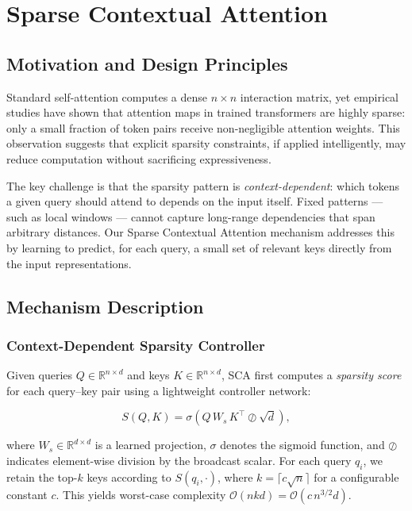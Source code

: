 \documentclass[12pt,a4paper,oneside]{book}
\begin{document}
\chapter{Sparse Contextual Attention}
\label{chap:sca}

\section{Motivation and Design Principles}

Standard self-attention computes a dense $n \times n$ interaction matrix, yet empirical
studies \cite{clark2019does, kovaleva2019revealing} have shown that attention maps in
trained transformers are highly sparse: only a small fraction of token pairs receive
non-negligible attention weights. This observation suggests that explicit sparsity
constraints, if applied intelligently, may reduce computation without sacrificing
expressiveness.

The key challenge is that the sparsity pattern is \textit{context-dependent}:
which tokens a given query should attend to depends on the input itself. Fixed patterns
— such as local windows — cannot capture long-range dependencies that span arbitrary
distances. Our Sparse Contextual Attention mechanism addresses this by learning to
predict, for each query, a small set of relevant keys directly from the input
representations.

\section{Mechanism Description}
\label{sec:sca}

\subsection{Context-Dependent Sparsity Controller}

Given queries $Q \in \mathbb{R}^{n \times d}$ and keys $K \in \mathbb{R}^{n \times d}$,
SCA first computes a \textit{sparsity score} for each query--key pair using a lightweight
controller network:

\begin{equation}
  S(Q,K) = \sigma\!\left( Q\,W_s\,K^{\top} \oslash \sqrt{d} \right),
  \label{eq:sparsity-score}
\end{equation}

where $W_s \in \mathbb{R}^{d \times d}$ is a learned projection, $\sigma$ denotes the
sigmoid function, and $\oslash$ indicates element-wise division by the broadcast scalar.
For each query $q_i$, we retain the top-$k$ keys according to $S(q_i, \cdot)$, where
$k = \lceil c\sqrt{n} \rceil$ for a configurable constant $c$. This yields worst-case
complexity $\mathcal{O}(n k d) = \mathcal{O}(c\, n^{3/2} d)$.
\end{document}
